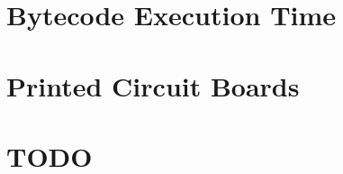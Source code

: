 \chapter{Bytecode Execution Time} \label{appx:bytecode}


%

%


\chapter{Printed Circuit Boards} \label{appx:boards}



%




\printindex

\chapter{TODO}




